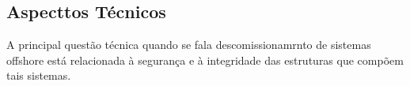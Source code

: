 \subsection{Aspecttos Técnicos}

A principal questão técnica quando se fala descomissionamrnto de sistemas offshore está relacionada à segurança e à integridade das estruturas que compõem tais sistemas.
